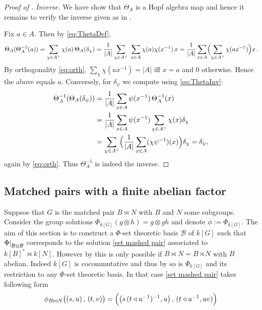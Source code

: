 \documentclass[a4paper,10pt]{amsart}
\theoremstyle{definition}
\theoremstyle{remark}
\newcommand\ot{\otimes}
\newcommand\mc{\mathcal}
\newcommand\restr[2]{{%
   \left.\kern-\nulldelimiterspace %
   #1 %
   \right|_{#2} %
   }}
\begin{document}
\begin{proof}[Proof of ]
\medskip\noindent
{\it Inverse.}
We have show that $\Theta_A$ is a Hopf algebra map and hence it remains to verify the inverse given as in .


Fix $a\in A$. Then by \eqref{eq:ThetaDef},
\[
\Theta_A(\Theta_A^{-1}(a))
=\sum_{\chi\in A^\vee}\chi(a)\,\Theta_A(\delta_\chi)
=\frac1{|A|}\sum_{\chi\in A^\vee}\ \sum_{x\in A}\chi(a)\chi(x^{-1})\,x
=\frac1{|A|}\sum_{x\in A}\Bigl(\sum_{\chi\in A^\vee}\chi(ax^{-1})\Bigr)x.
\]
By orthogonality \eqref{eq:orth}, $\sum_{\chi}\chi(ax^{-1})=|A|$ iff $x=a$ and $0$ otherwise. Hence the above equals $a$.
Conversely, for $\delta_\psi$ we compute using \eqref{eq:ThetaInv}:
\begin{align*}
\Theta_A^{-1}(\Theta_A(\delta_\psi))
& =\frac1{|A|}\sum_{x\in A}\psi(x^{-1})\,\Theta_A^{-1}(x)\\
& =\frac1{|A|}\sum_{x\in A}\psi(x^{-1})\sum_{\chi\in A^\vee}\chi(x)\delta_\chi \\
& =\sum_{\chi\in A^\vee}\Bigl(\frac1{|A|}\sum_{x\in A}(\chi\psi^{-1})(x)\Bigr)\delta_\chi
=\delta_\psi,
\end{align*}
again by \eqref{eq:orth}. Thus $\Theta_A^{-1}$ is indeed the inverse.
\end{proof}


\subsection{Matched pairs with a finite abelian factor}\label{sectie make out of finite abelian}

Suppsoe that $G$ is the matched pair $B \bowtie N$ with $B$ and $N$ some subgroups. Consider the group solutions $\Phi_{k[G]}(g\ot h)= g \ot gh$ and denote $\phi := \Phi_{k[G]}$. The aim of this section is to construct a $\Phi$-set theoretic basis $\mc{B}$ of $k[G]$ such that $\restr{\Phi}{\mc{B} \ot \mc{B}}$ corresponds to the solution \eqref{set mashed pair} associated to $k[B]^*\bowtie k[N]$. However by  this is only possible if $B \bowtie N = B \rtimes N$ with $B$ abelian. Indeed $k[G]$ is cocommutative and thus by  so is $\Phi_{k[G]}$ and its restriction to any $\Phi$-set theoretic basis. In that case \eqref{set mashed pair} takes following form
\begin{equation}\label{mashed pair sol for semid}
\phi_{B\bowtie N}\bigl((s,u)\, ,\, (t,v)\bigr)
=
\Bigl( \bigl(s\,(t\triangleleft u^{-1})^{-1}, u\bigr) \, , \,
(t\triangleleft u^{-1},  uv ) \Bigr)
\end{equation}
\end{document}
